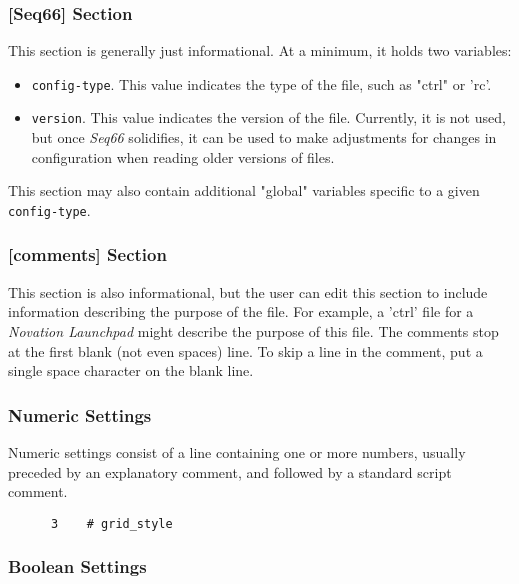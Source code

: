 \subsubsection{[Seq66] Section}
\label{subsec:configuration_common_seq66_section}

   This section is generally just informational.  At a minimum, it holds two
   variables:

   \begin{itemize}
      \item \texttt{config-type}.  This value indicates the type of the file,
      such as "ctrl" or 'rc'.
      \item \texttt{version}.  This value indicates the version of the file.
      Currently, it is not used, but once \textsl{Seq66} solidifies,
      it can be used to make adjustments for changes in configuration when
      reading older versions of files.
   \end{itemize}

   This section may also contain additional "global"
   variables specific to a given \texttt{config-type}.

\subsubsection{[comments] Section}
\label{subsec:configuration_common_comments_section}

   This section is also informational, but the user can edit this section to
   include information describing the purpose of the file.  For example, a 'ctrl'
   file for a \textsl{Novation Launchpad} might describe the purpose of this
   file.  The comments stop at the first blank (not even spaces) line.  To skip a
   line in the comment, put a single space character on the blank line.

\subsubsection{Numeric Settings}
\label{subsec:configuration_common_numeric_settings}

   Numeric settings consist of a line containing one or more numbers, usually
   preceded by an explanatory comment, and followed by a standard script comment.

   \begin{verbatim}
      3    # grid_style
   \end{verbatim}

\subsubsection{Boolean Settings}
\label{subsec:configuration_common_boolean_settings}

